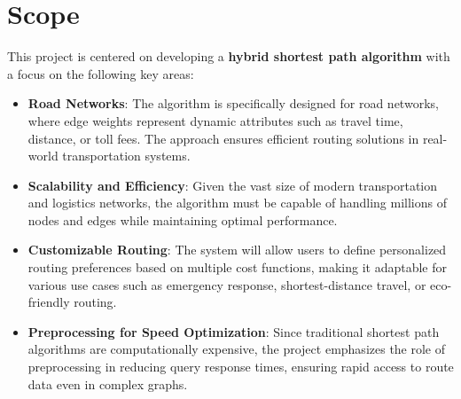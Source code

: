 	\section{Scope}
	This project is centered on developing a \textbf{hybrid shortest path algorithm} with a focus on the following key areas:
	\begin{itemize}
		\item \textbf{Road Networks}: The algorithm is specifically designed for road networks, where edge weights represent dynamic attributes such as travel time, distance, or toll fees. The approach ensures efficient routing solutions in real-world transportation systems.
		\item \textbf{Scalability and Efficiency}: Given the vast size of modern transportation and logistics networks, the algorithm must be capable of handling millions of nodes and edges while maintaining optimal performance.
		\item \textbf{Customizable Routing}: The system will allow users to define personalized routing preferences based on multiple cost functions, making it adaptable for various use cases such as emergency response, shortest-distance travel, or eco-friendly routing.
		\item \textbf{Preprocessing for Speed Optimization}: Since traditional shortest path algorithms are computationally expensive, the project emphasizes the role of preprocessing in reducing query response times, ensuring rapid access to route data even in complex graphs.
	\end{itemize}

